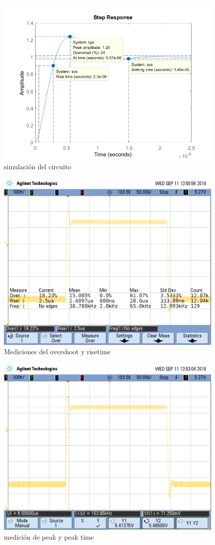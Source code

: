 \documentclass{article}
\begin{document}
\begin{figure}[H]
\centering
\includegraphics[width=0.8\linewidth]{images/05vpp/simu.PNG}
\caption{simulación del circuito}
\label{fig:simu}
\end{figure}


\begin{figure}[H]
\centering
\includegraphics[width=0.8\linewidth]{images/05vpp/os_rt05vpp.PNG}
\caption{Mediciones del overshoot y risetime}
\label{fig:os_rt05vpp}
\end{figure}

\begin{figure}[H]
\centering
\includegraphics[width=0.8\linewidth]{images/05vpp/tpeak_vpeak.PNG}
\caption{medición de peak y peak time}
\label{fig:tpeak_vpeak}
\end{figure}
\end{document}
